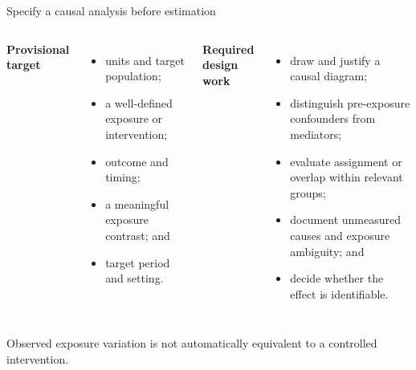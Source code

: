 \documentclass[10pt,aspectratio=169]{beamer}
\begin{document}
\begin{frame}{Specify a causal analysis before estimation}

\small

\begin{columns}[T]


\textbf{Provisional target}

\begin{itemize}
  \item units and target population;
  \item a well-defined exposure or intervention;
  \item outcome and timing;
  \item a meaningful exposure contrast; and
  \item target period and setting.
\end{itemize}


\textbf{Required design work}

\begin{itemize}
  \item draw and justify a causal diagram;
  \item distinguish pre-exposure confounders from mediators;
  \item evaluate assignment or overlap within relevant groups;
  \item document unmeasured causes and exposure ambiguity; and
  \item decide whether the effect is identifiable.
\end{itemize}

\end{columns}

\vspace{0.25cm}

\centering
\textcolor{ukudlaRed}{Observed exposure variation is not automatically equivalent to a controlled intervention.}

\end{frame}
\end{document}
